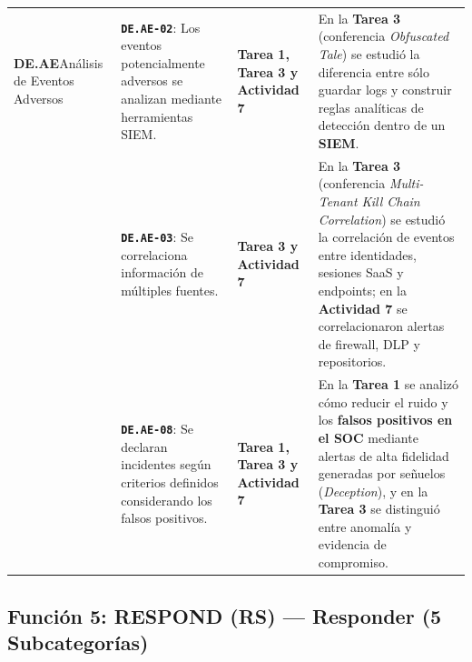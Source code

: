 \documentclass[letterpaper,11pt]{article}
\begin{document}
\begin{longtable}{|L{2.8cm}|L{4.5cm}|L{2.9cm}|L{6.5cm}|}
\textbf{DE.AE}\newline Análisis de Eventos Adversos &
\textbf{\texttt{DE.AE-02}}: Los eventos potencialmente adversos se analizan mediante herramientas SIEM. &
\textbf{Tarea 1, Tarea 3 y Actividad 7} &
En la \textbf{Tarea 3} (conferencia \textit{Obfuscated Tale}) se estudió la diferencia entre sólo guardar logs y construir reglas analíticas de detección dentro de un \textbf{SIEM}. \\
\nopagebreak
 &
\textbf{\texttt{DE.AE-03}}: Se correlaciona información de múltiples fuentes. &
\textbf{Tarea 3 y Actividad 7} &
En la \textbf{Tarea 3} (conferencia \textit{Multi-Tenant Kill Chain Correlation}) se estudió la correlación de eventos entre identidades, sesiones SaaS y endpoints; en la \textbf{Actividad 7} se correlacionaron alertas de firewall, DLP y repositorios. \\
\nopagebreak
 &
\textbf{\texttt{DE.AE-08}}: Se declaran incidentes según criterios definidos considerando los falsos positivos. &
\textbf{Tarea 1, Tarea 3 y Actividad 7} &
En la \textbf{Tarea 1} se analizó cómo reducir el ruido y los \textbf{falsos positivos en el SOC} mediante alertas de alta fidelidad generadas por señuelos (\textit{Deception}), y en la \textbf{Tarea 3} se distinguió entre anomalía y evidencia de compromiso. \\
\hline
\end{longtable}
\endgroup

\subsection{Función 5: RESPOND (RS) --- Responder (5 Subcategorías)}
\end{document}
